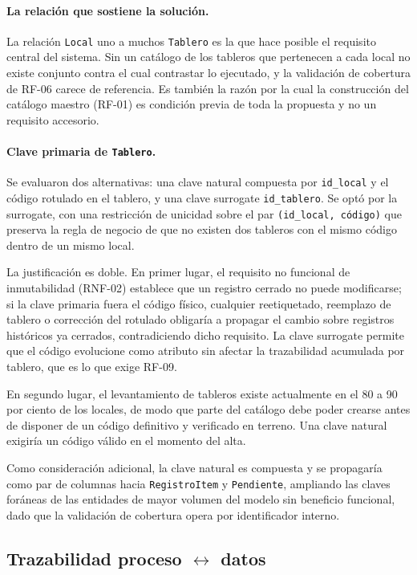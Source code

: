 \documentclass[10pt,letterpaper]{article}
\begin{document}
\paragraph{La relación que sostiene la solución.} La relación \texttt{Local}
uno a muchos \texttt{Tablero} es la que hace posible el requisito central del sistema.
Sin un catálogo de los tableros que pertenecen a cada local no existe conjunto contra
el cual contrastar lo ejecutado, y la validación de cobertura de RF-06 carece de
referencia. Es también la razón por la cual la construcción del catálogo maestro
(RF-01) es condición previa de toda la propuesta y no un requisito accesorio.

\paragraph{Clave primaria de \texttt{Tablero}.} Se evaluaron dos alternativas: una
clave natural compuesta por \texttt{id\_local} y el código rotulado en el tablero, y
una clave surrogate \texttt{id\_tablero}. Se optó por la surrogate, con una
restricción de unicidad sobre el par \texttt{(id\_local, código)} que preserva la
regla de negocio de que no existen dos tableros con el mismo código dentro de un
mismo local.

La justificación es doble. En primer lugar, el requisito no funcional de
inmutabilidad (RNF-02) establece que un registro cerrado no puede modificarse; si la
clave primaria fuera el código físico, cualquier reetiquetado, reemplazo de tablero o
corrección del rotulado obligaría a propagar el cambio sobre registros históricos ya
cerrados, contradiciendo dicho requisito. La clave surrogate permite que el código
evolucione como atributo sin afectar la trazabilidad acumulada por tablero, que es lo
que exige RF-09.

En segundo lugar, el levantamiento de tableros existe actualmente en el 80 a 90 por
ciento de los locales, de modo que parte del catálogo debe poder crearse antes de
disponer de un código definitivo y verificado en terreno. Una clave natural exigiría
un código válido en el momento del alta.

Como consideración adicional, la clave natural es compuesta y se propagaría como par
de columnas hacia \texttt{RegistroItem} y \texttt{Pendiente}, ampliando las claves
foráneas de las entidades de mayor volumen del modelo sin beneficio funcional, dado
que la validación de cobertura opera por identificador interno.

\subsection{Trazabilidad proceso $\leftrightarrow$ datos}
\end{document}
